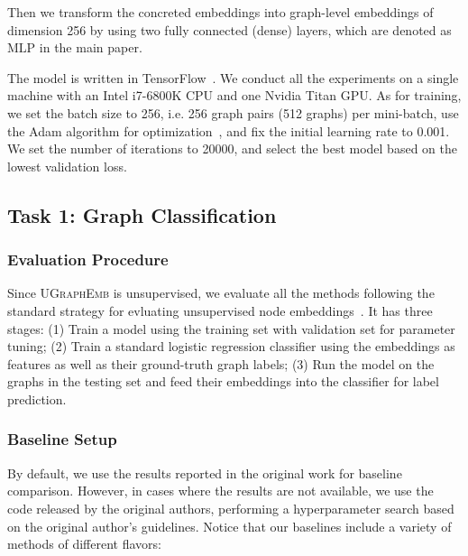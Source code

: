 \documentclass{article}
\newcommand{\model}{\textsc{UGraphEmb}\xspace}
\begin{document}
Then we transform the concreted embeddings into graph-level embeddings of dimension 256 by using two fully connected (dense) layers, which are denoted as $\mathrm{MLP}$ in the main paper. 

The model is written in TensorFlow~\cite{girija2016tensorflow}. We conduct all the experiments on a single machine with an Intel i7-6800K CPU and one Nvidia Titan GPU. As for training, we set the batch size to 256, i.e. 256 graph pairs (512 graphs) per mini-batch, use the Adam algorithm for optimization~\cite{kingma2014adam}, and fix the initial learning rate to 0.001. We set the number of iterations to 20000, and select the best model based on the lowest validation loss.


\subsection{Task 1: Graph Classification}

\subsubsection{Evaluation Procedure}

Since \model is unsupervised, we evaluate all the methods following the standard strategy for evluating unsupervised node embeddings~\cite{tang2015line,wang2016structural}. It has three stages: (1) Train a model using the training set with validation set for parameter tuning; (2) Train a standard logistic regression classifier using the embeddings as features as well as their ground-truth graph labels; (3) Run the model on the graphs in the testing set and feed their embeddings into the classifier for label prediction. 

\subsubsection{Baseline Setup}
\label{subsec-baseline-setup}

By default, we use the results reported in
the original work for baseline comparison. However, in cases where the results are not available, we use the code released by the original authors, performing a hyperparameter search based on the original author's guidelines. Notice that our baselines include a variety of methods of different flavors:
\end{document}
